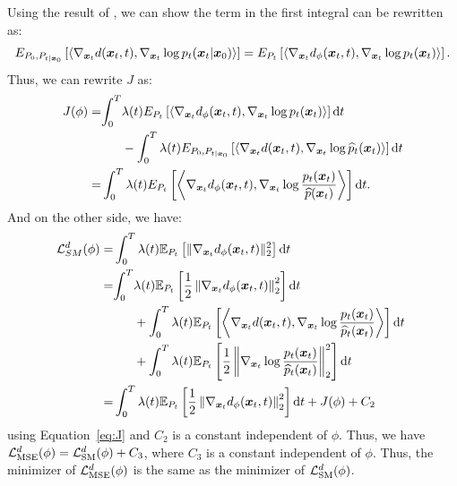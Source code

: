 Using the result of \citep{vincent_connection_2011}, we can show the term in the first integral can be rewritten as:
\begin{align}
    E_{P_0, P_{t\vert\boldsymbol{x}_0}}\left[\left\langle \nabla_{\boldsymbol{x}_t}d(\boldsymbol{x}_t, t), \nabla_{\boldsymbol{x}_t} \log p_t(\boldsymbol{x}_t\vert\boldsymbol{x}_0)\right\rangle\right] =  E_{P_t}\left[\left\langle \nabla_{\boldsymbol{x}_t}d_\phi(\boldsymbol{x}_t, t), \nabla_{\boldsymbol{x}_t} \log p_t(\boldsymbol{x}_t)\right\rangle\right].
\end{align}
Thus, we can rewrite $J$ as:
\begin{align}
    J(\phi) =& \begin{aligned}[t]
        \int_0^T&\lambda(t) E_{P_t}\left[\left\langle \nabla_{\boldsymbol{x}_t}d_\phi(\boldsymbol{x}_t, t), \nabla_{\boldsymbol{x}_t} \log p_t(\boldsymbol{x}_t)\right\rangle\right] \mathrm{d} t \\
        &- \int_0^T\lambda(t) E_{P_0, P_{t\vert\boldsymbol{x}_0}}\left[\left\langle \nabla_{\boldsymbol{x}_t}d(\boldsymbol{x}_t, t), \nabla_{\boldsymbol{x}_t} \log \widehat p_t(\boldsymbol{x}_t)\right\rangle\right] \mathrm{d} t
    \end{aligned} \\
    = & \int_0^T\lambda(t) E_{P_t}\left[\left\langle \nabla_{\boldsymbol{x}_t}d_\phi(\boldsymbol{x}_t, t),\nabla_{\boldsymbol{x}_t} \log \frac{p_t(\boldsymbol{x}_t)}{\widehat p(\boldsymbol{x}_t)}\right\rangle\right] \mathrm{d} t.\label{eq:J}
\end{align}
And on the other side, we have:
\begin{align}
    \calL_{SM}^d(\phi) =& \int_0^T\lambda(t) \E_{P_t}\left[\Vert \nabla_{\vx_t} \vd_\phi(\vx_t, t)\Vert_2^2\right] \dt \\
    =& \begin{aligned}[t]
        \int_0^T&\lambda(t) \E_{P_t}\left[\frac{1}{2}\left\Vert\nabla_{\vx_t} \vd_\phi(\vx_t, t)\right\Vert_2^2\right] \dt \\
        &+ \int_0^T\lambda(t) \E_{P_t}\left[\left\langle \nabla_{\vx_t}d(\vx_t, t), \nabla_{\vx_t} \log \frac{p_t(\vx_t)}{\whp_t(\vx_t)}\right\rangle\right] \dt \\
        &+ \int_0^T\lambda(t) \E_{P_t}\left[\frac{1}{2}\left\Vert\nabla_{\vx_t} \log \frac{p_t(\vx_t)}{\whp_t(\vx_t)}\right\Vert_2^2\right] \dt
    \end{aligned} \\
    =& \int_0^T\lambda(t) \E_{P_t}\left[\frac{1}{2}\left\Vert\nabla_{\vx_t} \vd_\phi(\vx_t, t)\right\Vert_2^2\right] \dt + J(\phi) + C_2 
\end{align}
using Equation~\eqref{eq:J} and $C_2$ is a constant independent of $\phi$. Thus, we have $\mathcal{L}_{\mathrm{MSE}}^{d}(\phi) = \mathcal{L}_{\mathrm{SM}}^{d}(\phi) + C_3$, where $C_3$ is a constant independent of $\phi$. Thus, the minimizer of $\mathcal{L}_{\mathrm{MSE}}^{d}(\phi)$ is the same as the minimizer of $\mathcal{L}_{\mathrm{SM}}^{d}(\phi)$.